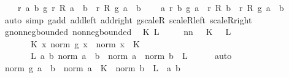 \begin{isabellebody}
\ \ \ \ {\isachardoublequoteopen}{\isasymAnd}r\ a\ b{\isachardot}{\kern0pt}\ g\ {\isacharparenleft}{\kern0pt}r\ {\isacharasterisk}{\kern0pt}\isactrlsub R\ a{\isacharparenright}{\kern0pt}\ {\isacharasterisk}{\kern0pt}{\isacharasterisk}{\kern0pt}\ b\ {\isacharequal}{\kern0pt}\ r\ {\isacharasterisk}{\kern0pt}\isactrlsub R\ {\isacharparenleft}{\kern0pt}g\ a\ {\isacharasterisk}{\kern0pt}{\isacharasterisk}{\kern0pt}\ b{\isacharparenright}{\kern0pt}{\isachardoublequoteclose}\isanewline
\ \ \ \ {\isachardoublequoteopen}{\isasymAnd}a\ r\ b{\isachardot}{\kern0pt}\ g\ a\ {\isacharasterisk}{\kern0pt}{\isacharasterisk}{\kern0pt}\ {\isacharparenleft}{\kern0pt}r\ {\isacharasterisk}{\kern0pt}\isactrlsub R\ b{\isacharparenright}{\kern0pt}\ {\isacharequal}{\kern0pt}\ r\ {\isacharasterisk}{\kern0pt}\isactrlsub R\ {\isacharparenleft}{\kern0pt}g\ a\ {\isacharasterisk}{\kern0pt}{\isacharasterisk}{\kern0pt}\ b{\isacharparenright}{\kern0pt}{\isachardoublequoteclose}\isanewline
\ \ \ \ \isamarkupfalse%
\ {\isacharparenleft}{\kern0pt}auto\ simp{\isacharcolon}{\kern0pt}\ g{\isachardot}{\kern0pt}add\ add{\isacharunderscore}{\kern0pt}left\ add{\isacharunderscore}{\kern0pt}right\ g{\isachardot}{\kern0pt}scaleR\ scaleR{\isacharunderscore}{\kern0pt}left\ scaleR{\isacharunderscore}{\kern0pt}right{\isacharparenright}{\kern0pt}\isanewline
\ \ \isamarkupfalse%
\ g{\isachardot}{\kern0pt}nonneg{\isacharunderscore}{\kern0pt}bounded\ nonneg{\isacharunderscore}{\kern0pt}bounded\ \isamarkupfalse%
\ K\ L\isanewline
\ \ \ \ \ nn{\isacharcolon}{\kern0pt}\ {\isachardoublequoteopen}{}\ {\isasymle}\ K{\isachardoublequoteclose}\ {\isachardoublequoteopen}{}\ {\isasymle}\ L{\isachardoublequoteclose}\isanewline
\ \ \ \ \ \ \ K{\isacharcolon}{\kern0pt}\ {\isachardoublequoteopen}{\isasymAnd}x{\isachardot}{\kern0pt}\ norm\ {\isacharparenleft}{\kern0pt}g\ x{\isacharparenright}{\kern0pt}\ {\isasymle}\ norm\ x\ {\isacharasterisk}{\kern0pt}\ K{\isachardoublequoteclose}\isanewline
\ \ \ \ \ \ \ L{\isacharcolon}{\kern0pt}\ {\isachardoublequoteopen}{\isasymAnd}a\ b{\isachardot}{\kern0pt}\ norm\ {\isacharparenleft}{\kern0pt}a\ {\isacharasterisk}{\kern0pt}{\isacharasterisk}{\kern0pt}\ b{\isacharparenright}{\kern0pt}\ {\isasymle}\ norm\ a\ {\isacharasterisk}{\kern0pt}\ norm\ b\ {\isacharasterisk}{\kern0pt}\ L{\isachardoublequoteclose}\isanewline
\ \ \ \ \isamarkupfalse%
\ auto\isanewline
\ \ \isamarkupfalse%
\ {\isachardoublequoteopen}norm\ {\isacharparenleft}{\kern0pt}g\ a\ {\isacharasterisk}{\kern0pt}{\isacharasterisk}{\kern0pt}\ b{\isacharparenright}{\kern0pt}\ {\isasymle}\ norm\ a\ {\isacharasterisk}{\kern0pt}\ K\ {\isacharasterisk}{\kern0pt}\ norm\ b\ {\isacharasterisk}{\kern0pt}\ L{\isachardoublequoteclose}\ \ a\ b\isanewline

\end{isabellebody}
